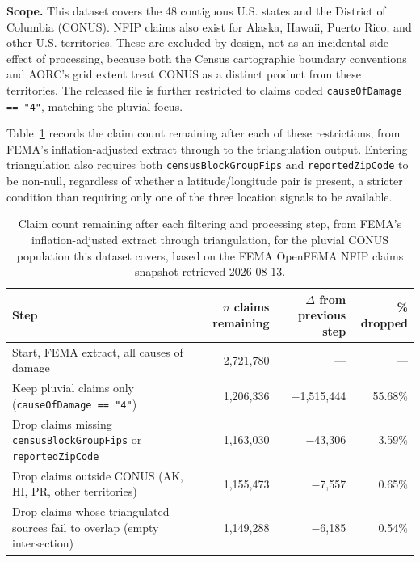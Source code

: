 
\textbf{Scope.} This dataset covers the 48 contiguous U.S. states and
the District of Columbia (CONUS). NFIP claims also exist for Alaska,
Hawaii, Puerto Rico, and other U.S. territories. These are excluded by
design, not as an incidental side effect of processing, because both
the Census cartographic boundary conventions and AORC's grid extent
treat CONUS as a distinct product from these territories. The released
file is further restricted to claims coded \texttt{causeOfDamage ==
"4"}, matching the pluvial focus.


Table~\ref{tab:claim-count-funnel} records the claim count remaining
after each of these restrictions, from FEMA's inflation-adjusted
extract through to the triangulation output. Entering triangulation
also requires both \texttt{censusBlockGroupFips} and
\texttt{reportedZipCode} to be non-null, regardless of whether a
latitude/longitude pair is present, a stricter condition than requiring
only one of the three location signals to be available.

\begin{table}[H]
\centering
\setlength{\tabcolsep}{4pt}
\begin{tabular}{>{\raggedright\arraybackslash}p{7.6cm}rrr}
\toprule
Step & $n$ claims remaining & $\Delta$ from previous step & \% dropped \\
\midrule
Start, FEMA extract, all causes of damage & 2{,}721{,}780 & --- & --- \\
Keep pluvial claims only (\texttt{causeOfDamage == "4"}) & 1{,}206{,}336 & $-$1{,}515{,}444 & 55.68\% \\
Drop claims missing \texttt{censusBlockGroupFips} or \texttt{reportedZipCode} & 1{,}163{,}030 & $-$43{,}306 & 3.59\% \\
Drop claims outside CONUS (AK, HI, PR, other territories) & 1{,}155{,}473 & $-$7{,}557 & 0.65\% \\
Drop claims whose triangulated sources fail to overlap (empty intersection) & 1{,}149{,}288 & $-$6{,}185 & 0.54\% \\
\bottomrule
\end{tabular}
\caption{Claim count remaining after each filtering and processing
step, from FEMA's inflation-adjusted extract through triangulation, for
the pluvial CONUS population this dataset covers, based on the FEMA
OpenFEMA NFIP claims snapshot retrieved 2026-08-13.}
\label{tab:claim-count-funnel}
\end{table}

